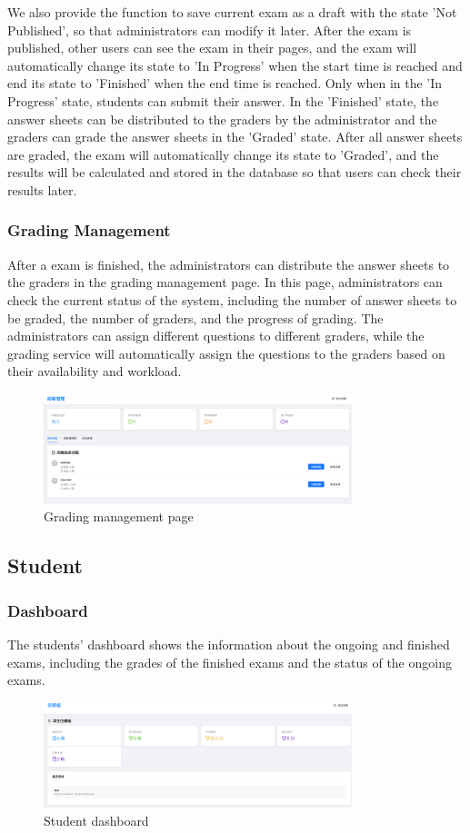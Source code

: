\documentclass[12pt]{article}
\begin{document}
We also provide the function to save
current exam as a draft with the state 'Not Published', so that administrators can modify it later.
After the exam is published, other users can see the exam in their pages, and the exam will automatically change its state to 'In Progress' when the start time is reached and
end its state to 'Finished' when the end time is reached. Only when in the 'In Progress' state, students can submit their answer.
In the 'Finished' state, the answer sheets can be distributed to the graders by the administrator and the graders can grade the answer sheets in the 'Graded' state.
After all answer sheets are graded, the exam will automatically change its state to 'Graded', and the results will be calculated and stored in the database
so that users can check their results later.
\subsubsection{Grading Management}
After a exam is finished, the administrators can distribute the answer sheets to the graders in the grading management page.
In this page, administrators can check the current status of the system, including the number of answer sheets to be graded, the number of graders,
and the progress of grading. The administrators can assign different questions to different graders, while the grading service
will automatically assign the questions to the graders based on their availability and workload.
\begin{figure}[H]
    \centering
    \includegraphics[width=0.8\textwidth]{admin/gradermanage.png}
    \caption{Grading management page}
    \label{fig:GradingManagement page}
\end{figure}
\subsection{Student}
\subsubsection{Dashboard}
The students' dashboard shows the information about the ongoing and finished exams, including the grades of the finished exams and the status of the ongoing exams.
\begin{figure}[H]
    \centering
    \includegraphics[width=0.8\textwidth]{student/dashboard.png}
    \caption{Student dashboard}
    \label{fig:StudentDashboard page}
\end{figure}
\end{document}
